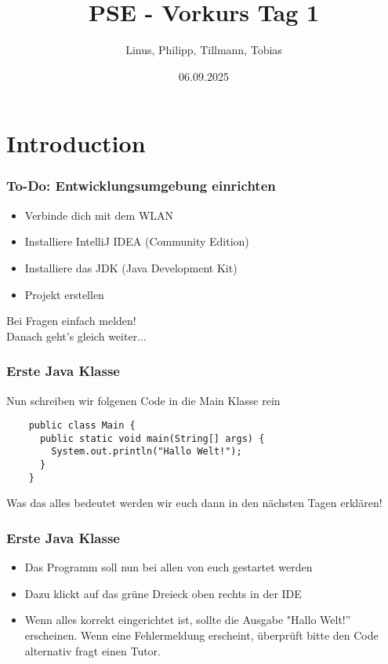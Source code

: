 \documentclass{../../presentation}
\title{PSE - Vorkurs Tag 1}
\author{Linus, Philipp, Tillmann, Tobias}
\institute{FIUS - Fachgruppe Informatik Universität Stuttgart}
\date{06.09.2025}
\begin{document}
\begin{frame}
  \titlepage
\end{frame}

\begin{frame}
  \listoftodos
\end{frame}

\section{Introduction}

\begin{frame}
  \frametitle{To-Do: Entwicklungsumgebung einrichten}

  \begin{itemize}
    \item Verbinde dich mit dem WLAN
    \item Installiere IntelliJ IDEA (Community Edition)
    \item Installiere das JDK (Java Development Kit)
    \item Projekt erstellen
  \end{itemize}
  \vfill
  \centering
  \Large
  Bei Fragen einfach melden! \\
  \vspace{0.5em}
  Danach geht's gleich weiter...
\end{frame}




\begin{frame}[fragile]
  \frametitle{Erste Java Klasse}
  Nun schreiben wir folgenen Code in die Main Klasse rein
  \begin{verbatim}
    public class Main {
      public static void main(String[] args) {
        System.out.println("Hallo Welt!");
      }
    }
  \end{verbatim}
  \achtung{} Was das alles bedeutet werden wir euch dann in den nächsten Tagen erklären!
\end{frame}

\begin{frame}
  \frametitle{Erste Java Klasse}
  \begin{itemize}
    \item Das Programm soll nun bei allen von euch gestartet werden
    \item Dazu klickt auf das grüne Dreieck oben rechts in der IDE
    \item Wenn alles korrekt eingerichtet ist, sollte die Ausgabe "Hallo Welt!'' erscheinen.
          \achtung{} Wenn eine Fehlermeldung erscheint, überprüft bitte den Code alternativ fragt einen Tutor.
  \end{itemize}
\end{frame}
\end{document}
